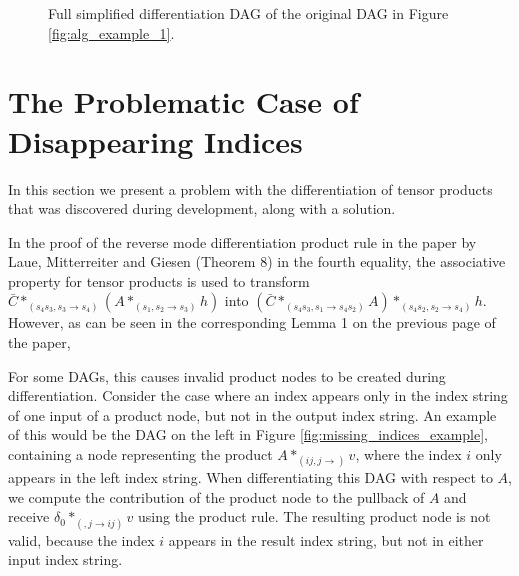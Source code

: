 \documentclass[12pt, a4paper]{report}
\begin{document}
\begin{figure}
    \centering
    \caption{Full simplified differentiation DAG of the original DAG in Figure \ref{fig:alg_example_1}.}
    \label{fig:alg_example_3}
\end{figure}

\FloatBarrier
\section{The Problematic Case of Disappearing Indices}
In this section we present a problem with the differentiation of tensor products that was discovered during development, along with a solution.

In the proof of the reverse mode differentiation product rule in the paper by Laue, Mitterreiter and Giesen \cite{tensorpaper} (Theorem 8) in the fourth equality, the associative property for tensor products is used to transform $\bar{C} *_{(s_4s_3,s_3 \rightarrow s_4)} (A *_{(s_1,s_2 \rightarrow s_3)} h)$ into $(\bar{C} *_{(s_4s_3,s_1 \rightarrow s_4s_2)} A) *_{(s_4s_2,s_2 \rightarrow s_4)} h$. 
However, as can be seen in the corresponding Lemma 1 on the previous page of the paper, %

For some DAGs, this causes invalid product nodes to be created during differentiation.
Consider the case where an index appears only in the index string of one input of a product node, but not in the output index string.
An example of this would be the DAG on the left in Figure \ref{fig:missing_indices_example}, containing a node representing the product $A *_{(ij,j \rightarrow )} v$, where the index $i$ only appears in the left index string.
When differentiating this DAG with respect to $A$, we compute the contribution of the product node to the pullback of $A$ and receive $\delta_0 *_{(,j \rightarrow ij)} v$ using the product rule.
The resulting product node is not valid, because the index $i$ appears in the result index string, but not in either input index string.
\end{document}
